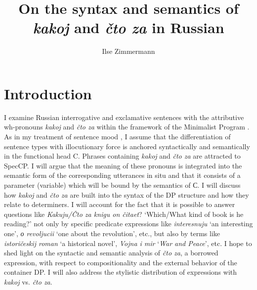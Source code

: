 \documentclass[output=paper,colorlinks,citecolor=brown]{langscibook}
\author{Ilse Zimmermann\affiliation{Centre for General Linguistics (ZAS), Berlin}}
\title{On the syntax and semantics of \textit{kakoj} and \textit{čto za} in Russian}
\begin{document}
\maketitle



\section{Introduction} \label{sec:zi08:1}
I examine Russian interrogative and exclamative sentences with the attributive wh-pronouns \textit{kakoj} and \textit{čto za} within the framework of the Minimalist Program \citep{zi08:Chomsky1995,Chomsky2004}. As in my treatment of sentence mood \citep{Zimmermann2009}, I assume that the differentiation of sentence types with illocutionary force is anchored syntactically and semantically in the functional head C. Phrases containing \textit{kakoj} and \textit{čto za} are attracted to SpecCP. I will argue that the meaning of these pronouns is integrated into the semantic form of the corresponding utterances in situ and that it consists of a parameter (variable) which will be bound by the semantics of С. I will discuss how \textit{kakoj} and \textit{čto za} are built into the syntax of the DP structure and how they relate to determiners. I will account for the fact that it is possible to answer questions like \textit{Kakuju/Čto za knigu on čitaet}? `Which/What kind of book is he reading?' not only by specific predicate expressions like \textit{interesnuju} `an interesting one', \textit{о revoljucii} `one about the revolution', etc., but also by terms like \textit{istoričeskij roman} `a historical novel', \textit{Vojna i mir} `\textit{War and Peace}', etc. I hope to shed light on the syntactic and semantic analysis of \textit{čto za}, a borrowed expression, with respect to compositionality and the external behavior of the container DP. I will also address the stylistic distribution of expressions with \textit{kakoj} vs. \textit{čto za}.
\end{document}
